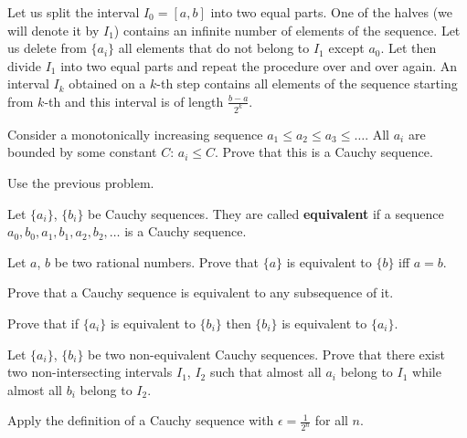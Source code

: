 \documentclass[12pt]{article}
\begin{document}
\begin{ukazanie} Let us split the interval $I_0=[a, b]$ into two
  equal parts. One of the halves (we will denote it by $I_1$) contains
 an infinite number of elements of the sequence. Let us delete from
 $\{a_i\}$ all elements that do not belong to $I_1$ except $a_0$. Let
 then divide $I_1$ into two equal parts and repeat the procedure over
 and over again. An interval $I_k$ obtained on a $k$-th step contains
 all elements of the sequence starting from $k$-th and this interval
 is of length $\frac{b-a}{2^k}$.
\end{ukazanie}

\begin{zadacha}[!] Consider a monotonically increasing sequence 
$a_1\leq a_2 \leq a_3 \leq\dots$. All $a_i$ are bounded by some
 constant $C$: $a_i \leq C$. Prove that this is a Cauchy sequence.
\end{zadacha}

\begin{ukazanie} Use the previous problem.
\end{ukazanie}

\begin{opredelenie} Let $\{ a_i\}$, $\{b_i\}$ be Cauchy
 sequences. They are called {\bf equivalent} if a sequence $a_0, b_0,
 a_1, b_1, a_2, b_2, \ldots $ is a Cauchy sequence.
\end{opredelenie}

\begin{zadacha}
Let $a$, $b$ be two rational numbers. Prove that $\{a\}$ is equivalent
to $\{b\}$ iff $a=b$.
\end{zadacha}

\begin{zadacha} Prove that a Cauchy sequence is equivalent to any
  subsequence of it.
\end{zadacha}

\begin{zadacha}
Prove that if $\{a_i\}$ is equivalent to $\{b_i\}$ then $\{b_i\}$ is
equivalent to $\{a_i\}$.
\end{zadacha}

\begin{zadacha}[!]\label{otdeleny}
Let $\{a_i\}$, $\{b_i\}$ be two non-equivalent Cauchy sequences. Prove
that there exist two non-intersecting intervals $I_1$, $I_2$ such that
almost all $a_i$ belong to $I_1$ while almost all $b_i$ belong to
$I_2$.
\end{zadacha}

\begin{ukazanie} Apply the definition of a Cauchy sequence with
$\epsilon = \frac{1}{2^n}$ for all $n$.
\end{ukazanie}
\end{document}
